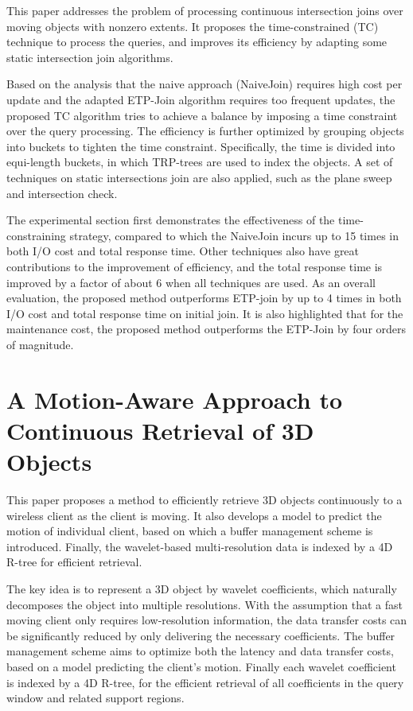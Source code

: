 \documentclass[paper=a4, fontsize=18pt]{article} %
\numberwithin{equation}{section} %
\numberwithin{figure}{section} %
\numberwithin{table}{section} %
\begin{document}
This paper addresses the problem of processing continuous intersection joins over moving objects with nonzero extents. It proposes the time-constrained (TC) technique to process the queries, and improves its efficiency by adapting some static intersection join algorithms.

Based on the analysis that the naive approach (NaiveJoin) requires high cost per update and the adapted ETP-Join algorithm requires too frequent updates, the proposed TC algorithm tries to achieve a balance by imposing a time constraint over the query processing. The efficiency is further optimized by grouping objects into buckets to tighten the time constraint. Specifically, the time is divided into equi-length buckets, in which TRP-trees are used to index the objects. A set of techniques on static intersections join are also applied, such as the plane sweep and intersection check.

The experimental section first demonstrates the effectiveness of the time-constraining strategy, compared to which the NaiveJoin incurs up to 15 times in both I/O cost and total response time. Other techniques also have great contributions to the improvement of efficiency, and the total response time is improved by a factor of about 6 when all techniques are used. As an overall evaluation, the proposed method outperforms ETP-join by up to 4 times in both I/O cost and total response time on initial join. It is also highlighted that for the maintenance cost, the proposed method outperforms the ETP-Join by four orders of magnitude.

\section{A Motion-Aware Approach to Continuous Retrieval of 3D Objects \cite{AZTK08}}

This paper proposes a method to efficiently retrieve 3D objects continuously to a wireless client as the client is moving. It also develops a model to predict the motion of individual client, based on which a buffer management scheme is introduced. Finally, the wavelet-based multi-resolution data is indexed by a 4D R-tree for efficient retrieval.

The key idea is to represent a 3D object by wavelet coefficients, which naturally decomposes the object into multiple resolutions. With the assumption that a fast moving client only requires low-resolution information, the data transfer costs can be significantly reduced by only delivering the necessary coefficients. The buffer management scheme aims to optimize both the latency and data transfer costs, based on a model predicting the client's motion. Finally each wavelet coefficient is indexed by a 4D R-tree, for the efficient retrieval of all coefficients in the query window and related support regions.
\end{document}

